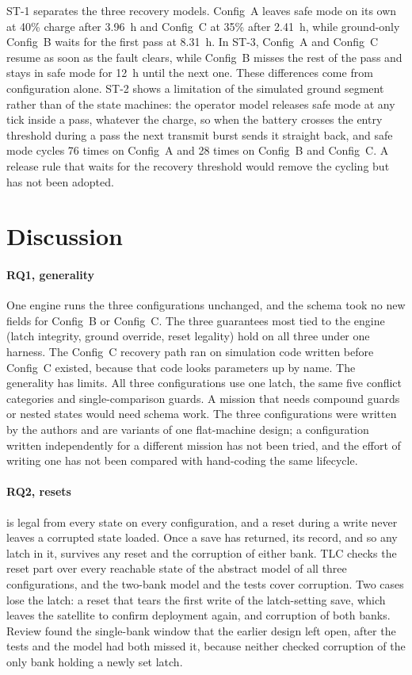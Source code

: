 \documentclass[preprint,12pt]{elsarticle}
\newcommand{\cfgA}{Config~A}
\newcommand{\cfgB}{Config~B}
\newcommand{\cfgC}{Config~C}
\begin{document}
ST-1 separates the three recovery models. \cfgA{} leaves safe mode on its own at 40\% charge after 3.96~h and \cfgC{} at 35\% after 2.41~h, while ground-only \cfgB{} waits for the first pass at 8.31~h. In ST-3, \cfgA{} and \cfgC{} resume as soon as the fault clears, while \cfgB{} misses the rest of the pass and stays in safe mode for 12~h until the next one. These differences come from configuration alone. ST-2 shows a limitation of the simulated ground segment rather than of the state machines: the operator model releases safe mode at any tick inside a pass, whatever the charge, so when the battery crosses the entry threshold during a pass the next transmit burst sends it straight back, and safe mode cycles 76 times on \cfgA{} and 28 times on \cfgB{} and \cfgC{}. A release rule that waits for the recovery threshold would remove the cycling but has not been adopted.

\section{Discussion}\label{sec:discussion}

\paragraph{RQ1, generality} One engine runs the three configurations unchanged, and the schema took no new fields for \cfgB{} or \cfgC{}. The three guarantees most tied to the engine (latch integrity, ground override, reset legality) hold on all three under one harness. The \cfgC{} recovery path ran on simulation code written before \cfgC{} existed, because that code looks parameters up by name. The generality has limits. All three configurations use one latch, the same five conflict categories and single-comparison guards. A mission that needs compound guards or nested states would need schema work. The three configurations were written by the authors and are variants of one flat-machine design; a configuration written independently for a different mission has not been tried, and the effort of writing one has not been compared with hand-coding the same lifecycle.

\paragraph{RQ2, resets}  is legal from every state on every configuration, and a reset during a write never leaves a corrupted state loaded. Once a save has returned, its record, and so any latch in it, survives any reset and the corruption of either bank. TLC checks the reset part over every reachable state of the abstract model of all three configurations, and the two-bank model and the tests cover corruption. Two cases lose the latch: a reset that tears the first write of the latch-setting save, which leaves the satellite to confirm deployment again, and corruption of both banks. Review found the single-bank window that the earlier design left open, after the tests and the model had both missed it, because neither checked corruption of the only bank holding a newly set latch.
\end{document}

